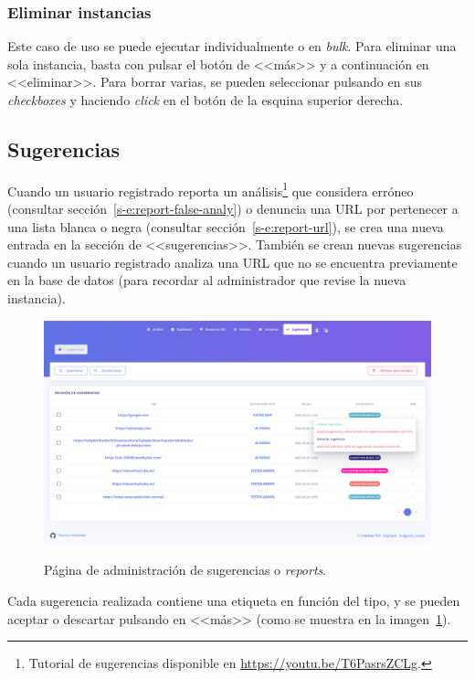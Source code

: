 \subsubsection{Eliminar instancias}

Este caso de uso se puede ejecutar individualmente o en \textit{bulk}. Para eliminar una sola instancia, basta con pulsar el botón de <<más>> y a continuación en <<eliminar>>. Para borrar varias, se pueden seleccionar pulsando en sus \textit{checkboxes} y haciendo \textit{click} en el botón de la esquina superior derecha.

\subsection{Sugerencias}
\label{s-e:sugerencias}

Cuando un usuario registrado reporta un análisis\footnote{Tutorial de sugerencias disponible en \url{https://youtu.be/T6PasrsZCLg}.} que considera erróneo (consultar sección~\ref{s-e:report-false-analy}) o denuncia una URL por pertenecer a una lista blanca o negra (consultar sección~\ref{s-e:report-url}), se crea una nueva entrada en la sección de <<sugerencias>>. También se crean nuevas sugerencias cuando un usuario registrado analiza una URL que no se encuentra previamente en la base de datos (para recordar al administrador que revise la nueva instancia).

\begin{figure}[h]
	\caption[Manual de usuario: administrar sugerencias]{Página de administración de sugerencias o \textit{reports}.}
	\centering
	\includegraphics[width=\textwidth]{../img/anexos/user_guide/7_reports}
	\label{e-7:reports}
\end{figure}

Cada sugerencia realizada contiene una etiqueta en función del tipo, y se pueden aceptar o descartar pulsando en <<más>> (como se muestra en la imagen~\ref{e-7:reports}).

